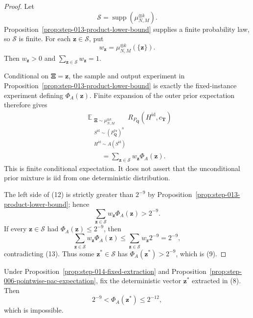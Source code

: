 \begin{proof}
Let
\[
\mathcal S=\operatorname{supp}(\mu_{N,M}^{\otimes k}).
\tag{10}
\]
Proposition~\ref{prop:step-013-product-lower-bound} supplies a finite
probability law, so
\(\mathcal S\) is finite. For each \(\boldsymbol z\in\mathcal S\), put
\[
w_{\boldsymbol z}=\mu_{N,M}^{\otimes k}(\{\boldsymbol z\}).
\tag{11}
\]
Then \(w_{\boldsymbol z}>0\) and
\(\sum_{\boldsymbol z\in\mathcal S}w_{\boldsymbol z}=1\).

Conditional on \(\boldsymbol\Xi=\boldsymbol z\), the sample and output
experiment in Proposition~\ref{prop:step-013-product-lower-bound}
is exactly the fixed-instance experiment defining \(\Phi_A(\boldsymbol z)\).
Finite expansion of the outer prior expectation therefore gives
\[
\begin{aligned}
&\mathbb E_{\substack{
  \boldsymbol\Xi\sim\mu_{N,M}^{\otimes k}\\
  S^{\mathrm{id}}\sim(P_{\boldsymbol Q}^{c_{\boldsymbol T}})^n\\
  H^{\mathrm{id}}\sim A(S^{\mathrm{id}})}}
  R_{P_{\boldsymbol Q}}(H^{\mathrm{id}},c_{\boldsymbol T})\\
&\qquad=\sum_{\boldsymbol z\in\mathcal S}
  w_{\boldsymbol z}\Phi_A(\boldsymbol z).
\end{aligned}
\tag{12}
\]
This is finite conditional expectation. It does not assert that the
unconditional prior mixture is iid from one deterministic distribution.

The left side of (12) is strictly greater than \(2^{-9}\) by Proposition~\ref{prop:step-013-product-lower-bound}; hence
\[
\sum_{\boldsymbol z\in\mathcal S}w_{\boldsymbol z}\Phi_A(\boldsymbol z)
>2^{-9}.
\tag{13}
\]
If every \(\boldsymbol z\in\mathcal S\) had
\(\Phi_A(\boldsymbol z)\le2^{-9}\), then
\[
\sum_{\boldsymbol z\in\mathcal S}w_{\boldsymbol z}\Phi_A(\boldsymbol z)
\le\sum_{\boldsymbol z\in\mathcal S}w_{\boldsymbol z}2^{-9}
=2^{-9},
\tag{14}
\]
contradicting (13). Thus some \(\boldsymbol z^*\in\mathcal S\) has
\(\Phi_A(\boldsymbol z^*)>2^{-9}\), which is (9). \end{proof}

\begin{proposition}\label{prop:step-014-fixed-contradiction}
Under Proposition~\ref{prop:step-014-fixed-extraction} and Proposition~\ref{prop:step-006-pointwise-pac-expectation}, fix the
deterministic vector \(\boldsymbol z^*\) extracted in (8). Then
\[
2^{-9}<\Phi_A(\boldsymbol z^*)\le2^{-12},
\tag{15}
\]
which is impossible.
\end{proposition}

